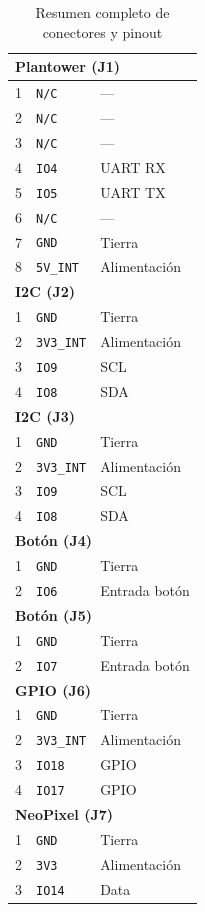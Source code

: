 \documentclass[9pt,a4paper,twocolumn,twoside]{rho-class/rho}
\begin{document}
\begin{table}[H]
\begin{tabular}{cll}
\midrule
\multicolumn{3}{l}{\textbf{Plantower (J1)}} \\
\midrule
1 & \texttt{N/C} & --- \\
2 & \texttt{N/C} & --- \\
3 & \texttt{N/C} & --- \\
4 & \texttt{IO4} & UART RX \\
5 & \texttt{IO5} & UART TX \\
6 & \texttt{N/C} & --- \\
7 & \texttt{GND} & Tierra \\
8 & \texttt{5V\_INT} & Alimentación \\

\midrule
\multicolumn{3}{l}{\textbf{I2C (J2)}} \\
\midrule
1 & \texttt{GND} & Tierra \\
2 & \texttt{3V3\_INT} & Alimentación \\
3 & \texttt{IO9} & SCL \\
4 & \texttt{IO8} & SDA \\

\midrule
\multicolumn{3}{l}{\textbf{I2C (J3)}} \\
\midrule
1 & \texttt{GND} & Tierra \\
2 & \texttt{3V3\_INT} & Alimentación \\
3 & \texttt{IO9} & SCL \\
4 & \texttt{IO8} & SDA \\

\midrule
\multicolumn{3}{l}{\textbf{Botón (J4)}} \\
\midrule
1 & \texttt{GND} & Tierra \\
2 & \texttt{IO6} & Entrada botón \\

\midrule
\multicolumn{3}{l}{\textbf{Botón (J5)}} \\
\midrule
1 & \texttt{GND} & Tierra \\
2 & \texttt{IO7} & Entrada botón \\

\midrule
\multicolumn{3}{l}{\textbf{GPIO (J6)}} \\
\midrule
1 & \texttt{GND} & Tierra \\
2 & \texttt{3V3\_INT} & Alimentación \\
3 & \texttt{IO18} & GPIO \\
4 & \texttt{IO17} & GPIO \\

\midrule
\multicolumn{3}{l}{\textbf{NeoPixel (J7)}} \\
\midrule
1 & \texttt{GND} & Tierra \\
2 & \texttt{3V3} & Alimentación \\
3 & \texttt{IO14} & Data \\

\bottomrule
\end{tabular}
\caption{Resumen completo de conectores y pinout}
\end{table}

\printbibliography
\end{document}
